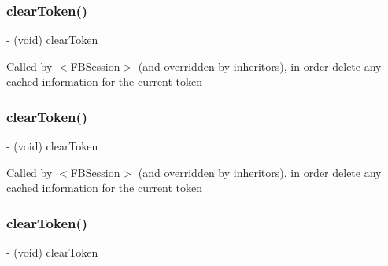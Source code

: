 \subsubsection{\texorpdfstring{clear\+Token()}{clearToken()}\hspace{0.1cm}{\footnotesize\ttfamily [2/5]}}
{\footnotesize\ttfamily -\/ (void) clear\+Token \begin{DoxyParamCaption}{ }\end{DoxyParamCaption}}

Called by $<$\+F\+B\+Session$>$ (and overridden by inheritors), in order delete any cached information for the current token \mbox{\label{interfaceFBSessionTokenCachingStrategy_a4cc3c2711517839cecad4b3047a28f85}} 
\subsubsection{\texorpdfstring{clear\+Token()}{clearToken()}\hspace{0.1cm}{\footnotesize\ttfamily [3/5]}}
{\footnotesize\ttfamily -\/ (void) clear\+Token \begin{DoxyParamCaption}{ }\end{DoxyParamCaption}}

Called by $<$\+F\+B\+Session$>$ (and overridden by inheritors), in order delete any cached information for the current token \mbox{\label{interfaceFBSessionTokenCachingStrategy_a4cc3c2711517839cecad4b3047a28f85}} 
\subsubsection{\texorpdfstring{clear\+Token()}{clearToken()}\hspace{0.1cm}{\footnotesize\ttfamily [4/5]}}
{\footnotesize\ttfamily -\/ (void) clear\+Token \begin{DoxyParamCaption}{ }\end{DoxyParamCaption}}

